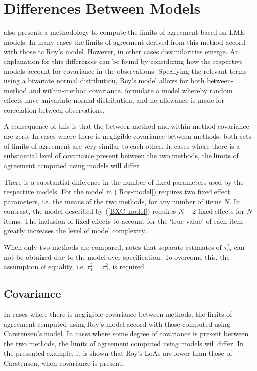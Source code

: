 \documentclass[12pt, a4paper]{report}
\theoremstyle{plain}
\theoremstyle{definition}
\theoremstyle{remark}
\begin{document}
	
	
\section{Differences Between Models}
\citet{BXC2008} also presents a methodology to compute the limits of agreement based on LME models. In many cases the limits of agreement derived from this method accord with those to Roy's model. However, in other cases dissimilarities emerge. An explanation for this differences can be found by considering how the respective models account for covariance in the observations. Specifying the relevant terms using a bivariate normal distribution, Roy's model allows for both between-method and within-method covariance. \citet{BXC2008} formulate a model whereby random effects have univariate normal distribution, and no allowance is made for correlation between observations.

A consequence of this is that the between-method and within-method covariance are zero. In cases where there is negligible covariance between methods, both sets of limits of agreement are very similar to each other. In cases where there is a substantial level of covariance present between the two methods, the limits of agreement computed using models will differ.

There is a substantial difference in the number of fixed parameters used by the respective models. For the model in (\ref{Roy-model}) requires two fixed effect parameters, i.e. the means of the two methods, for any number of items $N$. In contrast, the model described by (\ref{BXC-model}) requires $N+2$ fixed effects for $N$ items. The inclusion of fixed effects to account for the `true value' of each item greatly increases the level of model complexity.

When only two methods are compared, \citet{BXC2008} notes that separate estimates of $\tau^2_m$ can not be obtained due to the model over-specification. To overcome this, the assumption of equality, i.e. $\tau^2_1 = \tau^2_2$, is required.




\subsection{Covariance}


In cases where there is negligible covariance between methods, the limits of agreement computed using Roy's model accord with those computed using Carstensen's model. In cases where some degree of
covariance is present between the two methods, the limits of agreement computed using models will differ. In the presented
example, it is shown that Roy's LoAs are lower than those of Carstensen, when covariance is present.
\end{document}
